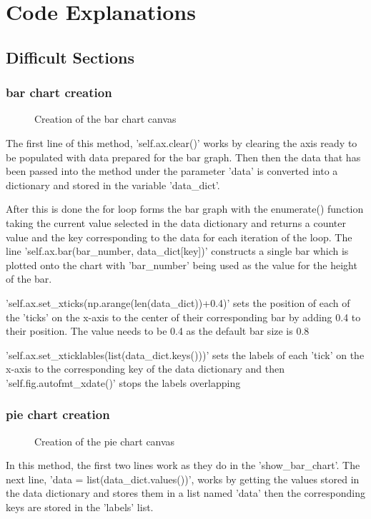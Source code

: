 \section{Code Explanations}

\subsection{Difficult Sections}

\subsubsection{bar chart creation}
\begin{figure}[H]
	\caption{Creation of the bar chart canvas} \label{python:bar_chart_canvas_code}
\end{figure}
The first line of this method, 'self.ax.clear()' works by clearing the axis ready to be populated with data prepared for the bar graph. Then then the data that has been passed into the method under the parameter 'data' is converted into a dictionary and stored in the variable 'data\_dict'. 

After this is done the for loop forms the bar graph with the enumerate() function taking the current value selected in the data dictionary and returns a counter value and the key corresponding to the data for each iteration of the loop. The line 'self.ax.bar(bar\_number, data\_dict[key])' constructs a single bar which is plotted onto the chart with 'bar\_number' being used as the value for the height of the bar.

'self.ax.set\_xticks(np.arange(len(data\_dict))+0.4)' sets the position of each of the 'ticks' on the x-axis to the center of their corresponding bar by adding 0.4 to their position. The value needs to be 0.4 as the default bar size is 0.8

'self.ax.set\_xticklables(list(data\_dict.keys()))' sets the labels of each 'tick' on the x-axis to the corresponding key of the data dictionary and then 'self.fig.autofmt\_xdate()' stops the labels overlapping


\subsubsection{pie chart creation}
\begin{figure}[H]
	\caption{Creation of the pie chart canvas} \label{python:pie_chart_canvas_code}
\end{figure}
In this method, the first two lines work as they do in the 'show\_bar\_chart'. The next line, 'data = list(data\_dict.values())', works by getting the values stored in the data dictionary and stores them in a list named 'data' then the corresponding keys are stored in the 'labels' list.

